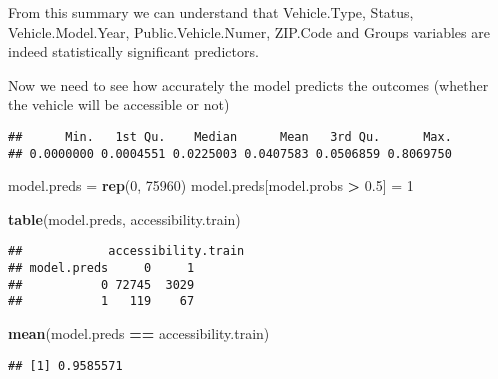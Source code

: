 \documentclass[
]{article}
\newenvironment{Shaded}{\begin{snugshade}}{\end{snugshade}}
\newcommand{\AttributeTok}[1]{\textcolor[rgb]{0.13,0.29,0.53}{#1}}
\newcommand{\DecValTok}[1]{\textcolor[rgb]{0.00,0.00,0.81}{#1}}
\newcommand{\FloatTok}[1]{\textcolor[rgb]{0.00,0.00,0.81}{#1}}
\newcommand{\FunctionTok}[1]{\textcolor[rgb]{0.13,0.29,0.53}{\textbf{#1}}}
\newcommand{\NormalTok}[1]{#1}
\newcommand{\OtherTok}[1]{\textcolor[rgb]{0.56,0.35,0.01}{#1}}
\newcommand{\SpecialCharTok}[1]{\textcolor[rgb]{0.81,0.36,0.00}{\textbf{#1}}}
\newcommand{\StringTok}[1]{\textcolor[rgb]{0.31,0.60,0.02}{#1}}
\begin{document}
From this summary we can understand that Vehicle.Type, Status,
Vehicle.Model.Year, Public.Vehicle.Numer, ZIP.Code and Groups variables
are indeed statistically significant predictors.

Now we need to see how accurately the model predicts the outcomes
(whether the vehicle will be accessible or not)

\begin{Shaded}
\end{Shaded}

\begin{verbatim}
##      Min.   1st Qu.    Median      Mean   3rd Qu.      Max. 
## 0.0000000 0.0004551 0.0225003 0.0407583 0.0506859 0.8069750
\end{verbatim}

\begin{Shaded}
\begin{Highlighting}[]
\NormalTok{model.preds }\OtherTok{=} \FunctionTok{rep}\NormalTok{(}\DecValTok{0}\NormalTok{, }\DecValTok{75960}\NormalTok{)}
\NormalTok{model.preds[model.probs }\SpecialCharTok{\textgreater{}} \FloatTok{0.5}\NormalTok{] }\OtherTok{=} \DecValTok{1}

\FunctionTok{table}\NormalTok{(model.preds, accessibility.train)}
\end{Highlighting}
\end{Shaded}

\begin{verbatim}
##            accessibility.train
## model.preds     0     1
##           0 72745  3029
##           1   119    67
\end{verbatim}

\begin{Shaded}
\begin{Highlighting}[]
\FunctionTok{mean}\NormalTok{(model.preds }\SpecialCharTok{==}\NormalTok{ accessibility.train)}
\end{Highlighting}
\end{Shaded}

\begin{verbatim}
## [1] 0.9585571
\end{verbatim}
\end{document}
